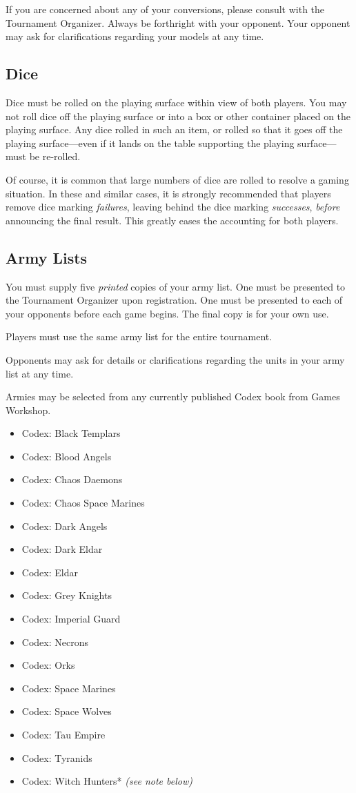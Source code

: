\documentclass[12pt,titlepage]{article}
\begin{document}
If you are concerned about any of your conversions, please consult with the Tournament Organizer. Always be forthright with your opponent. Your opponent may ask for clarifications regarding your models at any time.

\subsection*{Dice}

Dice must be rolled on the playing surface within view of both players. You may not roll dice off the playing surface or into a box or other container placed on the playing surface. Any dice rolled in such an item, or rolled so that it goes off the playing surface---even if it lands on the table supporting the playing surface---must be re-rolled.

Of course, it is common that large numbers of dice are rolled to resolve a gaming situation. In these and similar cases, it is strongly recommended that players remove dice marking \textit{failures}, leaving behind the dice marking \textit{successes}, \textit{before} announcing the final result. This greatly eases the accounting for both players.

\subsection*{Army Lists}

You must supply five \textit{printed} copies of your army list. One must be presented to the Tournament Organizer upon registration. One must be presented to each of your opponents before each game begins. The final copy is for your own use.

Players must use the same army list for the entire tournament.

Opponents may ask for details or clarifications regarding the units in your army list at any time.

Armies may be selected from any currently published Codex book from Games Workshop.

\begin{itemize}
\item Codex: Black Templars
\item Codex: Blood Angels
\item Codex: Chaos Daemons
\item Codex: Chaos Space Marines
\item Codex: Dark Angels
\item Codex: Dark Eldar
\item Codex: Eldar
\item Codex: Grey Knights
\item Codex: Imperial Guard
\item Codex: Necrons
\item Codex: Orks
\item Codex: Space Marines
\item Codex: Space Wolves
\item Codex: Tau Empire
\item Codex: Tyranids
\item Codex: Witch Hunters* \textit{(see note below)}
\end{itemize}
\end{document}
